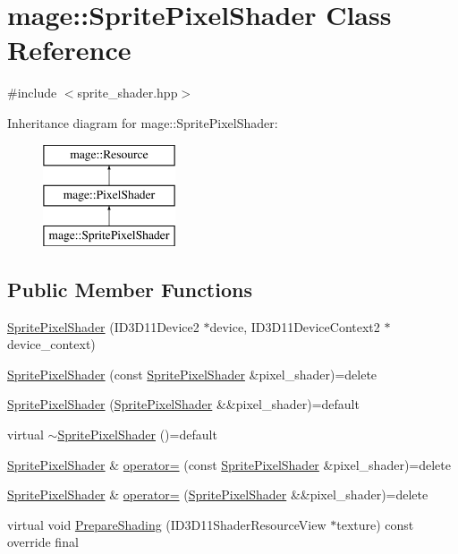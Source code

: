 \hypertarget{classmage_1_1_sprite_pixel_shader}{}\section{mage\+:\+:Sprite\+Pixel\+Shader Class Reference}
\label{classmage_1_1_sprite_pixel_shader}


{\ttfamily \#include $<$sprite\+\_\+shader.\+hpp$>$}

Inheritance diagram for mage\+:\+:Sprite\+Pixel\+Shader\+:\begin{figure}[H]
\begin{center}
\leavevmode
\includegraphics[height=3.000000cm]{classmage_1_1_sprite_pixel_shader}
\end{center}
\end{figure}
\subsection*{Public Member Functions}
\begin{DoxyCompactItemize}
\item 
\hyperlink{classmage_1_1_sprite_pixel_shader_abffbb811fa7b34e538748ae5d082aec4}{Sprite\+Pixel\+Shader} (I\+D3\+D11\+Device2 $\ast$device, I\+D3\+D11\+Device\+Context2 $\ast$device\+\_\+context)
\item 
\hyperlink{classmage_1_1_sprite_pixel_shader_a5803ea69e04c58528f9c4fbbc0f4efbc}{Sprite\+Pixel\+Shader} (const \hyperlink{classmage_1_1_sprite_pixel_shader}{Sprite\+Pixel\+Shader} \&pixel\+\_\+shader)=delete
\item 
\hyperlink{classmage_1_1_sprite_pixel_shader_a2ec1a47d5ada6e2e319605108f971d0c}{Sprite\+Pixel\+Shader} (\hyperlink{classmage_1_1_sprite_pixel_shader}{Sprite\+Pixel\+Shader} \&\&pixel\+\_\+shader)=default
\item 
virtual \hyperlink{classmage_1_1_sprite_pixel_shader_af7d6fd20a491855f8dfd2aef5e6294c4}{$\sim$\+Sprite\+Pixel\+Shader} ()=default
\item 
\hyperlink{classmage_1_1_sprite_pixel_shader}{Sprite\+Pixel\+Shader} \& \hyperlink{classmage_1_1_sprite_pixel_shader_adf6e6f0872406b9df46cb87731ed1ae0}{operator=} (const \hyperlink{classmage_1_1_sprite_pixel_shader}{Sprite\+Pixel\+Shader} \&pixel\+\_\+shader)=delete
\item 
\hyperlink{classmage_1_1_sprite_pixel_shader}{Sprite\+Pixel\+Shader} \& \hyperlink{classmage_1_1_sprite_pixel_shader_ad982c266c5ba3510009a3f5e7519e284}{operator=} (\hyperlink{classmage_1_1_sprite_pixel_shader}{Sprite\+Pixel\+Shader} \&\&pixel\+\_\+shader)=delete
\item 
virtual void \hyperlink{classmage_1_1_sprite_pixel_shader_a8c0c4daf36c74822a772b1a38e8d876a}{Prepare\+Shading} (I\+D3\+D11\+Shader\+Resource\+View $\ast$texture) const override final
\end{DoxyCompactItemize}
